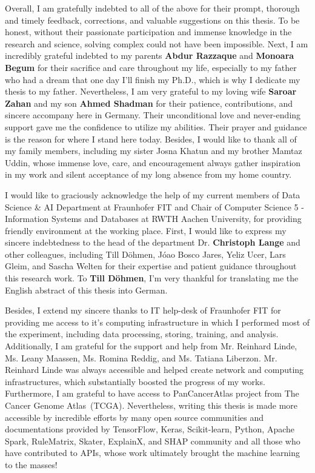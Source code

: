 \begin{acknowledgements}
    \hspace*{5mm} Overall, I am gratefully indebted to all of the above for their prompt, thorough and timely feedback, corrections, and valuable suggestions on this thesis. To be honest, without their passionate participation and immense knowledge in the research and science, solving complex could not have been impossible. Next, I am incredibly grateful indebted to my parents \textbf{Abdur Razzaque} and \textbf{Monoara Begum} for their sacrifice and care throughout my life, especially to my father who had a dream that one day I'll finish my Ph.D., which is why I dedicate my thesis to my father. Nevertheless, I am very grateful to my loving wife \textbf{Saroar Zahan} and my son \textbf{Ahmed Shadman} for their patience, contributions, and sincere accompany here in Germany. Their unconditional love and never-ending support gave me the confidence to utilize my abilities. Their prayer and guidance is the reason for where I stand here today. Besides, I would like to thank all of my family members, including my sister Josna Khatun and my brother Mamtaz Uddin, whose immense love, care, and encouragement always gather inspiration in my work and silent acceptance of my long absence from my home country. 
    
    \hspace*{5mm} I would like to graciously acknowledge the help of my current members of Data Science \& AI Department at Fraunhofer FIT and Chair of Computer Science 5 - Information Systems and Databases at RWTH Aachen University, for providing friendly environment at the working place. First, I would like to express my sincere indebtedness to the head of the department Dr. \textbf{Christoph Lange} and other colleagues, including Till D{\"o}hmen, J{\'o}ao Bosco Jares, Yeliz Ucer, Lars Gleim, and Sascha Welten for their expertise and patient guidance throughout this research work. To \textbf{Till D{\"o}hmen}, I'm very thankful for translating me the English abstract of this thesis into German. 
    
    \hspace*{5mm} Besides, I extend my sincere thanks to IT help-desk of Fraunhofer FIT for providing me access to it's computing infrastructure in which I performed most of the experiment, including data processing, storing, training, and analysis. Additionally, I am grateful for the support and help from Mr. Reinhard Linde, Ms. Leany Maassen, Ms. Romina Reddig, and Ms. Tatiana Liberzon. Mr. Reinhard Linde was always accessible and helped create network and computing infrastructures, which substantially boosted the progress of my works. Furthermore, I am grateful to have access to PanCancerAtlas project from The Cancer Genome Atlas~(TCGA). Nevertheless, writing this thesis is made more accessible by incredible efforts by many open source communities and documentations provided by TensorFlow, Keras, Scikit-learn, Python, Apache Spark, RuleMatrix, Skater, ExplainX, and SHAP community and all those who have contributed to APIs, whose work ultimately brought the machine learning to the masses! 
    

\end{acknowledgements}
